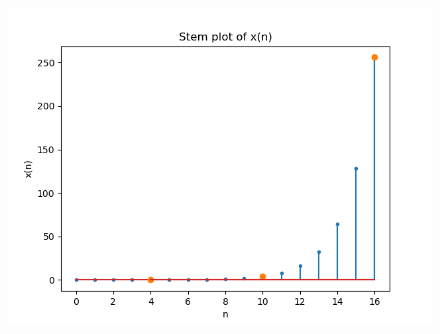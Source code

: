 \documentclass[journal,12pt,twocolumn]{IEEEtran}
\theoremstyle{remark}
\begin{document}
\begin{enumerate}
\begin{figure}[!h]
    \includegraphics[width=\columnwidth]{A_1.png}
        \label{fig:1}
\end{figure}


\end{enumerate}
\end{document}

